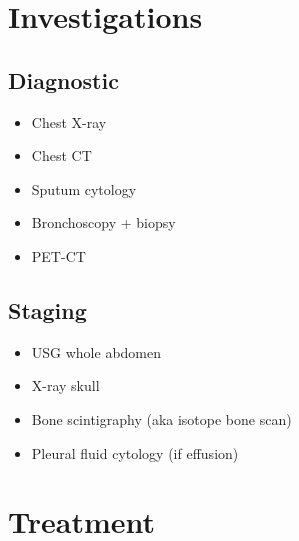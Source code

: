 \documentclass[
  12pt,
]{memoir}
\providecommand{\tightlist}{%
  \setlength{\itemsep}{0pt}\setlength{\parskip}{0pt}}
\begin{document}
\hypertarget{investigations}{%
\section{Investigations}\label{investigations}}

\hypertarget{diagnostic}{%
\subsection{Diagnostic}\label{diagnostic}}

\begin{itemize}
\tightlist
\item
  Chest X-ray
\item
  Chest CT
\item
  Sputum cytology
\item
  Bronchoscopy + biopsy
\item
  PET-CT
\end{itemize}

\hypertarget{staging}{%
\subsection{Staging}\label{staging}}

\begin{itemize}
\tightlist
\item
  USG whole abdomen
\item
  X-ray skull
\item
  Bone scintigraphy (aka isotope bone scan)
\item
  Pleural fluid cytology (if effusion)
\end{itemize}

\hypertarget{treatment}{%
\section{Treatment}\label{treatment}}
\end{document}
